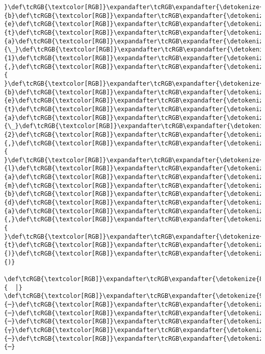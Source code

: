 \documentclass[11pt]{article}
\begin{document}
\begin{Verbatim}[commandchars=\\\{\}, frame=single, framerule=2mm, rulecolor=\color{outerrorbackground}]
}\def\tcRGB{\textcolor[RGB]}\expandafter\tcRGB\expandafter{\detokenize{178,178,178}}{b}\def\tcRGB{\textcolor[RGB]}\expandafter\tcRGB\expandafter{\detokenize{178,178,178}}{e}\def\tcRGB{\textcolor[RGB]}\expandafter\tcRGB\expandafter{\detokenize{178,178,178}}{t}\def\tcRGB{\textcolor[RGB]}\expandafter\tcRGB\expandafter{\detokenize{178,178,178}}{a}\def\tcRGB{\textcolor[RGB]}\expandafter\tcRGB\expandafter{\detokenize{178,178,178}}{\_}\def\tcRGB{\textcolor[RGB]}\expandafter\tcRGB\expandafter{\detokenize{178,178,178}}{1}\def\tcRGB{\textcolor[RGB]}\expandafter\tcRGB\expandafter{\detokenize{178,178,178}}{,}\def\tcRGB{\textcolor[RGB]}\expandafter\tcRGB\expandafter{\detokenize{178,178,178}}{ }\def\tcRGB{\textcolor[RGB]}\expandafter\tcRGB\expandafter{\detokenize{95,0,135}}{b}\def\tcRGB{\textcolor[RGB]}\expandafter\tcRGB\expandafter{\detokenize{95,0,135}}{e}\def\tcRGB{\textcolor[RGB]}\expandafter\tcRGB\expandafter{\detokenize{95,0,135}}{t}\def\tcRGB{\textcolor[RGB]}\expandafter\tcRGB\expandafter{\detokenize{95,0,135}}{a}\def\tcRGB{\textcolor[RGB]}\expandafter\tcRGB\expandafter{\detokenize{95,0,135}}{\_}\def\tcRGB{\textcolor[RGB]}\expandafter\tcRGB\expandafter{\detokenize{95,0,135}}{2}\def\tcRGB{\textcolor[RGB]}\expandafter\tcRGB\expandafter{\detokenize{178,178,178}}{,}\def\tcRGB{\textcolor[RGB]}\expandafter\tcRGB\expandafter{\detokenize{178,178,178}}{ }\def\tcRGB{\textcolor[RGB]}\expandafter\tcRGB\expandafter{\detokenize{178,178,178}}{l}\def\tcRGB{\textcolor[RGB]}\expandafter\tcRGB\expandafter{\detokenize{178,178,178}}{a}\def\tcRGB{\textcolor[RGB]}\expandafter\tcRGB\expandafter{\detokenize{178,178,178}}{m}\def\tcRGB{\textcolor[RGB]}\expandafter\tcRGB\expandafter{\detokenize{178,178,178}}{b}\def\tcRGB{\textcolor[RGB]}\expandafter\tcRGB\expandafter{\detokenize{178,178,178}}{d}\def\tcRGB{\textcolor[RGB]}\expandafter\tcRGB\expandafter{\detokenize{178,178,178}}{a}\def\tcRGB{\textcolor[RGB]}\expandafter\tcRGB\expandafter{\detokenize{178,178,178}}{,}\def\tcRGB{\textcolor[RGB]}\expandafter\tcRGB\expandafter{\detokenize{178,178,178}}{ }\def\tcRGB{\textcolor[RGB]}\expandafter\tcRGB\expandafter{\detokenize{178,178,178}}{t}\def\tcRGB{\textcolor[RGB]}\expandafter\tcRGB\expandafter{\detokenize{178,178,178}}{)}\def\tcRGB{\textcolor[RGB]}\expandafter\tcRGB\expandafter{\detokenize{178,178,178}}{)}
 \def\tcRGB{\textcolor[RGB]}\expandafter\tcRGB\expandafter{\detokenize{88,88,88}}{  │}                                 \def\tcRGB{\textcolor[RGB]}\expandafter\tcRGB\expandafter{\detokenize{95,0,135}}{─}\def\tcRGB{\textcolor[RGB]}\expandafter\tcRGB\expandafter{\detokenize{95,0,135}}{─}\def\tcRGB{\textcolor[RGB]}\expandafter\tcRGB\expandafter{\detokenize{95,0,135}}{─}\def\tcRGB{\textcolor[RGB]}\expandafter\tcRGB\expandafter{\detokenize{95,0,135}}{┬}\def\tcRGB{\textcolor[RGB]}\expandafter\tcRGB\expandafter{\detokenize{95,0,135}}{─}\def\tcRGB{\textcolor[RGB]}\expandafter\tcRGB\expandafter{\detokenize{95,0,135}}{─}  

\end{Verbatim}
\end{document}
